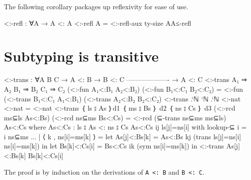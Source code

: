 The following corollary packages up reflexivity for ease of use.

\begin{fence}
\begin{code}
<:-refl : ∀{A} → A <: A
<:-refl {A} = <:-refl-aux {ty-size A}{A}{≤-refl}
\end{code}
\end{fence}

\hypertarget{subtyping-is-transitive}{%
\section{Subtyping is transitive}\label{subtyping-is-transitive}}

\begin{fence}
\begin{code}
<:-trans : ∀{A B C}
    → A <: B   →   B <: C
      -------------------
    → A <: C
<:-trans {A₁ ⇒ A₂} {B₁ ⇒ B₂} {C₁ ⇒ C₂} (<:-fun A₁<:B₁ A₂<:B₂) (<:-fun B₁<:C₁ B₂<:C₂) =
    <:-fun (<:-trans B₁<:C₁ A₁<:B₁) (<:-trans A₂<:B₂ B₂<:C₂)
<:-trans {.`ℕ} {`ℕ} {.`ℕ} <:-nat <:-nat = <:-nat
<:-trans {｛ ls ⦂ As ｝{d1} } {｛ ms ⦂ Bs ｝ {d2} } {｛ ns ⦂ Cs ｝ {d3} }
    (<:-rcd ms⊆ls As<:Bs) (<:-rcd ns⊆ms Bs<:Cs) =
    <:-rcd (⊆-trans ns⊆ms ms⊆ls) As<:Cs
    where
    As<:Cs : ls ⦂ As <: ns ⦂ Cs
    As<:Cs {i}{j} ls[j]=ns[i]
        with lookup-⊆ {i = i} ns⊆ms
    ... | ⟨ k , ns[i]=ms[k] ⟩ =
        let As[j]<:Bs[k] = As<:Bs {k}{j} (trans ls[j]=ns[i] ns[i]=ms[k]) in
        let Bs[k]<:Cs[i] = Bs<:Cs {i}{k} (sym ns[i]=ms[k]) in
        <:-trans As[j]<:Bs[k] Bs[k]<:Cs[i]
\end{code}
\end{fence}

The proof is by induction on the derivations of
\texttt{A\ \textless{}:\ B} and \texttt{B\ \textless{}:\ C}.

